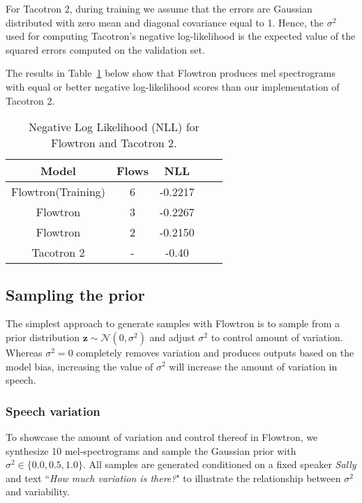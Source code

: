 \documentclass{article}
\begin{document}
For Tacotron 2, during training we assume that the errors are Gaussian distributed with zero mean and diagonal covariance equal to 1. Hence, the $\sigma^2$ used for computing Tacotron's negative log-likelihood is the expected value of the squared errors computed on the validation set.

The results in Table~\ref{tab:nll} below show that Flowtron produces mel spectrograms with equal or better negative log-likelihood scores than our implementation of Tacotron 2.

\begin{table}[!ht]
\begin{center}
    \begin{tabular}{ c|c|c|c|c}
        \textbf{Model} & \textbf{Flows} &  \textbf{NLL}\\
        \hline
        Flowtron(Training)      & 6         & -0.2217 \\
        Flowtron      & 3         & -0.2267 \\
        Flowtron      & 2         & -0.2150 \\
        Tacotron 2    & -         & -0.40 \\
        \hline
    \end{tabular}
    \caption{Negative Log Likelihood (NLL) for Flowtron and Tacotron 2.}
    \label{tab:nll}
\end{center}
\end{table}
\fi

\subsection{Sampling the prior}\label{sec:sampling_prior}
The simplest approach to generate samples with Flowtron is to sample from a prior distribution $\boldsymbol{z} \sim \mathcal{N}(0, \sigma^2)$ and adjust $\sigma^2$ to control amount of variation. Whereas $\sigma^2=0$ completely removes variation and produces outputs based on the model bias, increasing the value of  $\sigma^2$ will increase the amount of variation in speech. 

\subsubsection{Speech variation}
To showcase the amount of variation and control thereof in Flowtron, we synthesize 10 mel-spectrograms and sample the Gaussian prior with $\sigma^2 \in \{0.0, 0.5, 1.0\}$. All samples are generated conditioned on a fixed speaker \textit{Sally} and text ``\textit{How much variation is there?}" to illustrate the relationship between $\sigma^2$ and variability. 
\end{document}
